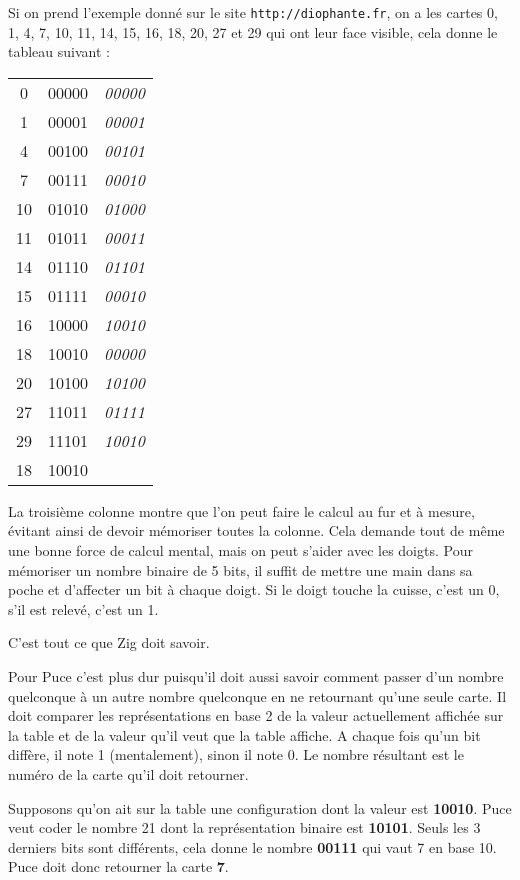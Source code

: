 \documentclass[10pt,a4paper,onecolumn]{article}
\begin{document}
Si on prend l'exemple donné sur le site {\tt http://diophante.fr}, on a les cartes 0, 1, 4, 7, 10, 11, 14, 15, 16, 18, 20, 27 et 29 qui ont leur face visible, cela donne le tableau suivant :

\begin{tabular}{|c|c|c|}
\hline
0  & 00000 & \it 00000 \\
1  & 00001 & \it 00001 \\
4  & 00100 & \it 00101 \\
7  & 00111 & \it 00010 \\
10 & 01010 & \it 01000 \\
11 & 01011 & \it 00011 \\
14 & 01110 & \it 01101 \\
15 & 01111 & \it 00010 \\
16 & 10000 & \it 10010 \\
18 & 10010 & \it 00000 \\
20 & 10100 & \it 10100 \\
27 & 11011 & \it 01111 \\
29 & 11101 & \it 10010 \\\hline
18 & 10010 &  \\\hline
\end{tabular}

La troisième colonne montre que l'on peut faire le calcul au fur et à mesure, évitant ainsi de devoir mémoriser toutes la colonne. Cela demande tout de même une bonne force de calcul mental, mais on peut s'aider avec les doigts. Pour mémoriser un nombre binaire de 5 bits, il suffit de mettre une main dans sa poche et d'affecter un bit à chaque doigt. Si le doigt touche la cuisse, c'est un 0, s'il est relevé, c'est un 1.

C'est tout ce que Zig doit savoir.

\vspace{8cm}
Pour Puce c'est plus dur puisqu'il doit aussi savoir comment passer d'un nombre quelconque à un autre nombre quelconque en ne retournant qu'une seule carte.
Il doit comparer les représentations en base 2 de la valeur actuellement affichée sur la table et de la valeur qu'il veut que la table affiche. A chaque fois qu'un bit diffère, il note 1 (mentalement), sinon il note 0. Le nombre résultant est le numéro de la carte qu'il doit retourner.

Supposons qu'on ait sur la table une configuration dont la valeur est {\bf 10010}. Puce veut coder le nombre 21 dont la représentation binaire est {\bf 10101}. Seuls les 3 derniers bits sont différents, cela donne le nombre {\bf 00111} qui vaut 7 en base 10. Puce doit donc retourner la carte {\bf 7}.
\end{document}
